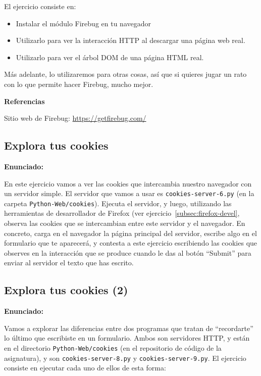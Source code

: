 El ejercicio consiste en:

\begin{itemize}
\item Instalar el módulo Firebug en tu navegador
\item Utilizarlo para ver la interacción HTTP al descargar una página web real.
\item Utilizarlo para ver el árbol DOM de una página HTML real.
\end{itemize}

Más adelante, lo utilizaremos para otras cosas, así que si quieres jugar un rato con lo que permite hacer Firebug, mucho mejor.

\textbf{Referencias}

Sitio web de Firebug: \url{https://getfirebug.com/}


\subsection{Explora tus cookies}
\label{subsec:explora-cookies}

\textbf{Enunciado:}

En este ejercicio vamos a ver las cookies que intercambia nuestro navegador con un servidor simple. El servidor que vamos a usar es \verb|cookies-server-6.py| (en la carpeta \verb|Python-Web/cookies|). Ejecuta el servidor, y luego, utilizando las herramientas de desarrollador de Firefox (ver ejercicio~\ref{subsec:firefox-devel}, observa las cookies que se intercambian entre este servidor y el navegador. En concreto, carga en el navegador la página principal del servidor, escribe algo en el formulario que te aparecerá, y contesta a este ejercicio escribiendo las cookies que observes en la interacción que se produce cuando le das al botón ``Submit'' para enviar al servidor el texto que has escrito.

\subsection{Explora tus cookies (2)}
\label{subsec:explora-cookies-2}

\textbf{Enunciado:}

Vamos a explorar las diferencias entre dos programas que tratan de ``recordarte'' lo último que escribiste en un formulario. Ambos son servidores HTTP, y están en el directorio \verb|Python-Web/cookies| (en el repositorio de código de la asignatura), y son \verb|cookies-server-8.py| y \verb|cookies-server-9.py|. El ejercicio consiste en ejecutar cada uno de ellos de esta forma:

